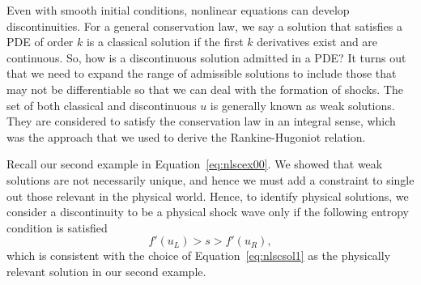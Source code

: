 Even with smooth initial conditions, nonlinear equations can develop discontinuities. For a general conservation law, we say a solution that satisfies a PDE of order $k$ is a classical solution if the first $k$ derivatives exist and are continuous. So, how is a discontinuous solution admitted in a PDE? It turns out that we need to expand the range of admissible solutions to include those that may not be differentiable so that we can deal with the formation of shocks. The set of both classical and discontinuous $u$ is generally known as weak solutions. They are considered to satisfy the conservation law in an integral sense, which was the approach that we used to derive the Rankine-Hugoniot relation.

Recall our second example in Equation~\ref{eq:nlscex00}. We showed that weak solutions are not necessarily unique, and hence we must add a constraint to single out those relevant in the physical world. Hence, to identify physical solutions, we consider a discontinuity to be a physical shock wave only if the following entropy condition is satisfied 
\begin{equation}
	f'(u_L) > s > f'(u_R),
\end{equation}
which is consistent with the choice of Equation~\ref{eq:nlscsol1} as the physically relevant solution in our second example.


